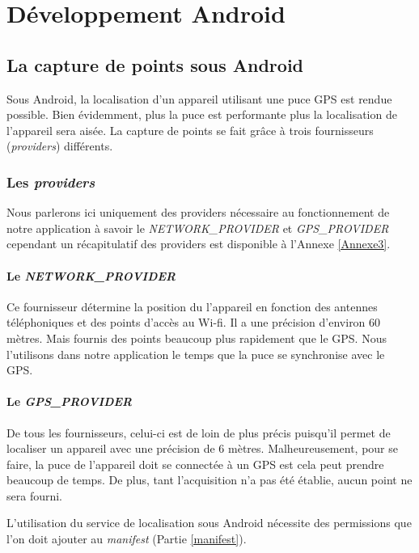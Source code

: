 \chapter{Développement Android}

\section{La capture de points sous Android}
\label{capture de points}
Sous Android, la localisation d'un appareil utilisant une puce GPS est rendue possible. Bien évidemment, plus la puce est performante plus la localisation de l’appareil sera aisée. La capture de points se fait grâce à trois fournisseurs (\textit{providers}) différents.

\subsection{Les \textit{providers}}
Nous parlerons ici uniquement des providers nécessaire au fonctionnement de notre application à savoir le \textit{NETWORK\_PROVIDER} et \textit{GPS\_PROVIDER} cependant un récapitulatif des providers est disponible à l'Annexe \ref{Annexe3}.

\subsubsection{Le \textit{NETWORK\_PROVIDER}}
Ce fournisseur détermine la position du l'appareil en fonction des antennes téléphoniques et des points d'accès au Wi-fi. Il a une précision d'environ 60 mètres. Mais fournis des points beaucoup plus rapidement que le GPS. Nous l'utilisons dans notre application le temps que la puce se synchronise avec le GPS.

\subsubsection{Le \textit{GPS\_PROVIDER}}
De tous les fournisseurs, celui-ci est de loin de plus précis puisqu'il permet de localiser un appareil avec une précision de 6 mètres. Malheureusement, pour se faire, la puce de l'appareil doit se connectée à un GPS est cela peut prendre beaucoup de temps. De plus, tant l'acquisition n'a pas été établie, aucun point ne sera fourni.

\begin{note}
L'utilisation du service de localisation sous Android nécessite des permissions que l'on doit ajouter au \textit{manifest} (Partie \ref{manifest}).
\end{note}

